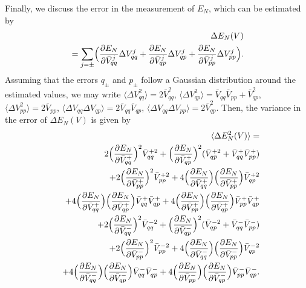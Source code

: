 \documentclass[twocolumn,superscriptaddress,aps,preprintnumbers,amsmath,amssymb,prl,nofootinbib]{revtex4}
\begin{document}
Finally, we discuss the error in the measurement of $E_N$, which can be 
estimated by 
\begin{eqnarray}
&&\hspace{-5mm}
\Delta E_N(V)
\nonumber\\
&&\hspace{-3mm}=
\sum_{j=\pm}\Bigl({\partial E_N\over \partial{\bar V^j_{qq}}}\Delta V^j_{qq}
+{\partial E_N\over \partial{\bar V^j_{qp}}}\Delta V^j_{qp}
+{\partial E_N\over \partial{\bar V^j_{pp}}}\Delta V^j_{pp}\Bigr). 
\end{eqnarray}
Assuming that the errors $q_\pm$ and $p_\pm$ 
follow a Gaussian distribution around the estimated values, 
we may write
$\langle\Delta V_{qq}^2\rangle=2\bar V_{qq}^2
$, 
$\langle\Delta V_{qp}^2\rangle=\bar V_{qq}\bar V_{pp}+\bar V_{qp}^2
$, 
$\langle\Delta V_{pp}^2\rangle=2\bar V_{pp}
$, 
$\langle\Delta V_{qq}\Delta V_{qp}\rangle=2\bar V_{qq}\bar V_{qp}
$, 
$\langle\Delta V_{qq}\Delta V_{pp}\rangle=2\bar V_{qp}^2$. 
Then, the variance in the error of $\Delta E_N(V)$ is given by
\begin{eqnarray}
\hspace{-5mm}&&\langle \Delta E_N^2(V)\rangle=
\nonumber\\
&&
2\Bigl({\partial E_N\over \partial {\bar V^+_{qq}}}\Bigr)^2\bar V^{+2}_{qq}
+\Bigl({\partial E_N\over \partial {\bar V^+_{qp}}}\Bigr)^2(\bar V^{+2}_{qp}+\bar V^+_{qq}\bar V^+_{pp})
\nonumber\\
&&+2\Bigl({\partial E_N\over \partial {\bar V^+_{pp}}}\Bigr)^2\bar V^{+2}_{pp}
+4\Bigl({\partial E_N\over \partial {\bar V^+_{qq}}}\Bigr)
\Bigl({\partial E_N\over \partial {\bar V^+_{pp}}}\Bigr)
\bar V^{+2}_{qp}
\nonumber\\
&&+4\Bigl({\partial E_N\over \partial {\bar V^+_{qq}}}\Bigr)
\Bigl({\partial E_N\over \partial {\bar V^+_{qp}}}\Bigr)\bar V^+_{qq}\bar V^+_{qp}
+4
\Bigl({\partial E_N\over \partial {\bar V^+_{pp}}}\Bigr)
\Bigl({\partial E_N\over \partial {\bar V^+_{qp}}}\Bigr)\bar V^+_{pp}\bar V^+_{qp}
\nonumber\\
&&+2\Bigl({\partial E_N\over \partial {\bar V^-_{qq}}}\Bigr)^2\bar V^{-2}_{qq}
+\Bigl({\partial E_N\over \partial {\bar V^-_{qp}}}\Bigr)^2(\bar V^{-2}_{qp}+\bar V^-_{qq}\bar V^-_{pp})
\nonumber\\
&&+2\Bigl({\partial E_N\over \partial {\bar V^-_{pp}}}\Bigr)^2\bar V^{-2}_{pp}
+4\Bigl({\partial E_N\over \partial {\bar V^-_{qq}}}\Bigr)
\Bigl({\partial E_N\over \partial {\bar V^-_{pp}}}\Bigr)\bar V^{-2}_{qp}
\nonumber\\
&&+4\Bigl({\partial E_N\over \partial {\bar V^-_{qq}}}\Bigr)
\Bigl({\partial E_N\over \partial {\bar V^-_{qp}}}\Bigr)\bar V^-_{qq}\bar V^-_{qp}
+4
\Bigl({\partial E_N\over \partial {\bar V^-_{pp}}}\Bigr)
\Bigl({\partial E_N\over \partial {\bar V^-_{qp}}}\Bigr)\bar V^-_{pp}\bar V^-_{qp}.
\nonumber\\
\end{eqnarray}
\end{document}
